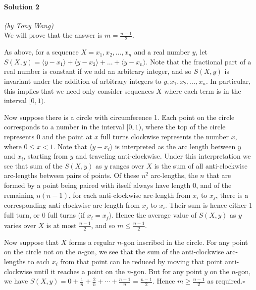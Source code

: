 \documentclass[10pt]{article}
\begin{document}
		{\centering \noindent \makebox[\linewidth]{\rule{\textwidth}{0.4pt}}}
	
	\paragraph{Solution 2} \textit{(by Tony Wang)}\\
	
	\noindent We will prove that the answer is \(m = \frac{n-1}{2}\).
	
	As above, for a sequence \(X = x_1, x_2, \dots, x_n\) and a real number \(y\), let \(S(X,y) = \langle y - x_1 \rangle + \langle y - x_2 \rangle + \dots + \langle y - x_n \rangle\). Note that the fractional part of a real number is constant if we add an arbitrary integer, and so \(S(X,y)\) is invariant under the addition of arbitrary integers to \(y, x_1, x_2, \dots, x_n\). In particular, this implies that we need only consider sequences \(X\) where each term is in the interval \([0,1)\).
	
	Now suppose there is a circle with circumference 1. Each point on the circle corresponds to a number in the interval \([0,1)\), where the top of the circle represents 0 and the point at \(x\) full turns clockwise represents the number \(x\), where \(0 \leq x < 1\). Note that \(\langle y - x_i \rangle\) is interpreted as the arc length between \(y\) and \(x_i\), starting from \(y\) and traveling anti-clockwise. Under this interpretation we see that sum of the \(S(X,y)\) as \(y\) ranges over \(X\) is the sum of all anti-clockwise arc-lengths between pairs of points. Of these \(n^2\) arc-lengths, the \(n\) that are formed by a point being paired with itself always have length 0, and of the remaining \(n(n-1)\), for each anti-clockwise arc-length from \(x_i\) to \(x_j\), there is a corresponding anti-clockwise arc-length from \(x_j\) to \(x_i\). Their sum is hence either 1 full turn, or 0 full turns (if \(x_i = x_j\)). Hence the average value of \(S(X,y)\) as \(y\) varies over \(X\) is at most \(\frac{n-1}{2}\), and so \(m \leq \frac{n-1}{2}\).
	
	Now suppose that \(X\) forms a regular \(n\)-gon inscribed in the circle. For any point on the circle not on the \(n\)-gon, we see that the sum of the anti-clockwise arc-lengths to each \(x_i\) from that point can be reduced by moving that point anti-clockwise until it reaches a point on the \(n\)-gon. But for any point \(y\) on the \(n\)-gon, we have \(S(X,y) = 0 + \frac 1n + \frac 2n + \cdots + \frac{n-1}{n} = \frac{n-1}{2}\). Hence \(m \geq \frac{n-1}{2}\) as required.\hfill\ensuremath{\square}
	
\end{document}
